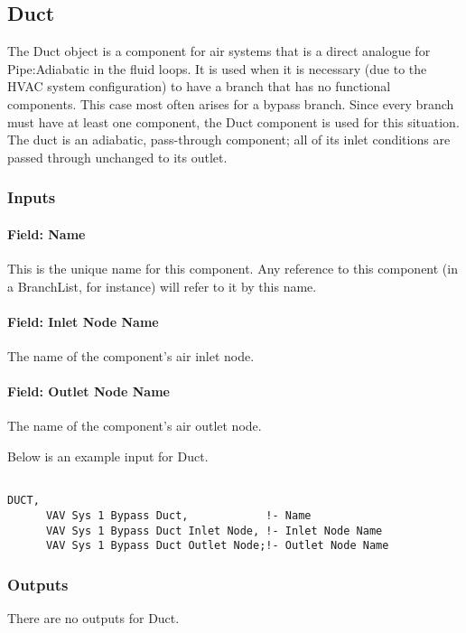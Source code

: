 \subsection{Duct}\label{duct}

The Duct object is a component for air systems that is a direct analogue for Pipe:Adiabatic in the fluid loops. It is used when it is necessary (due to the HVAC system configuration) to have a branch that has no functional components. This case most often arises for a bypass branch. Since every branch must have at least one component, the Duct component is used for this situation. The duct is an adiabatic, pass-through component; all of its inlet conditions are passed through unchanged to its outlet.

\subsubsection{Inputs}\label{inputs-12-009}

\paragraph{Field: Name}\label{field-name-12-006}

This is the unique name for this component. Any reference to this component (in a BranchList, for instance) will refer to it by this name.

\paragraph{Field: Inlet Node Name}\label{field-inlet-node-name-2-000}

The name of the component's air inlet node.

\paragraph{Field: Outlet Node Name}\label{field-outlet-node-name-2-000}

The name of the component's air outlet node.

Below is an example input for Duct.

\begin{lstlisting}

DUCT,
      VAV Sys 1 Bypass Duct,            !- Name
      VAV Sys 1 Bypass Duct Inlet Node, !- Inlet Node Name
      VAV Sys 1 Bypass Duct Outlet Node;!- Outlet Node Name
\end{lstlisting}

\subsubsection{Outputs}\label{outputs-10-004}

There are no outputs for Duct.